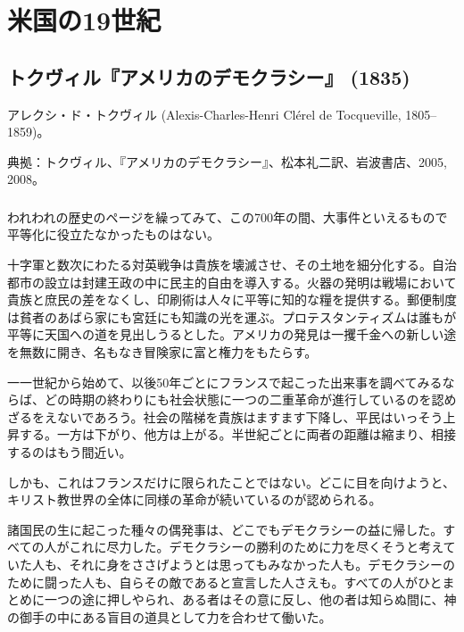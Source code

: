 
\chapter{米国の19世紀}



\section{トクヴィル『アメリカのデモクラシー』 (1835)}

アレクシ・ド・トクヴィル (Alexis-Charles-Henri Cl\'{e}rel de Tocqueville, 1805--1859)。


典拠：トクヴィル、『アメリカのデモクラシー』、松本礼二訳、岩波書店、2005, 2008。



\subsection{}



われわれの歴史のページを繰ってみて、この700年の間、大事件といえるもので平等化に役立たなかったものはない。

十字軍と数次にわたる対英戦争は貴族を壊滅させ、その土地を細分化する。自治都市の設立は封建王政の中に民主的自由を導入する。火器の発明は戦場において貴族と庶民の差をなくし、印刷術は人々に平等に知的な糧を提供する。郵便制度は貧者のあばら家にも宮廷にも知識の光を運ぶ。プロテスタンティズムは誰もが平等に天国への道を見出しうるとした。アメリカの発見は一攫千金への新しい途を無数に開き、名もなき冒険家に富と権力をもたらす。

一一世紀から始めて、以後50年ごとにフランスで起こった出来事を調べてみるならば、どの時期の終わりにも社会状態に一つの二重革命が進行しているのを認めざるをえないであろう。社会の階梯を貴族はますます下降し、平民はいっそう上昇する。一方は下がり、他方は上がる。半世紀ごとに両者の距離は縮まり、相接するのはもう間近い。

しかも、これはフランスだけに限られたことではない。どこに目を向けようと、キリスト教世界の全体に同様の革命が続いているのが認められる。

諸国民の生に起こった種々の偶発事は、どこでもデモクラシーの益に帰した。すべての人がこれに尽力した。デモクラシーの勝利のために力を尽くそうと考えていた人も、それに身をささげようとは思ってもみなかった人も。デモクラシーのために闘った人も、自らその敵であると宣言した人さえも。すべての人がひとまとめに一つの途に押しやられ、ある者はその意に反し、他の者は知らぬ間に、神の御手の中にある盲目の道具として力を合わせて働いた。

